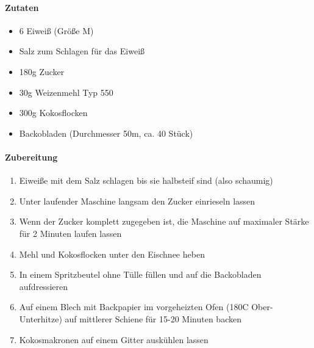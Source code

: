 
\paragraph{Zutaten}
\begin{itemize}[noitemsep]
	\item 6 Eiweiß (Größe M)
	\item Salz zum Schlagen für das Eiweiß
	\item 180g Zucker
	\item 30g Weizenmehl Typ 550
	\item 300g Kokosflocken
	\item Backobladen (Durchmesser 50m, ca. 40 Stück)
\end{itemize}


\paragraph{Zubereitung}
\begin{enumerate}[noitemsep]
	\item Eiweiße mit dem Salz schlagen bis sie halbsteif sind (also schaumig)
	\item Unter laufender Maschine langsam den Zucker einrieseln lassen
	\item Wenn der Zucker komplett zugegeben ist, die Maschine auf maximaler Stärke für 2 Minuten laufen lassen
	\item Mehl und Kokosflocken unter den Eischnee heben
	\item In einem Spritzbeutel ohne Tülle füllen und auf die Backobladen aufdressieren
	\item Auf einem Blech mit Backpapier im vorgeheizten Ofen (180\textdegree C Ober-Unterhitze) auf mittlerer Schiene für 15-20 Minuten backen
	\item Kokosmakronen auf einem Gitter auskühlen lassen
\end{enumerate}